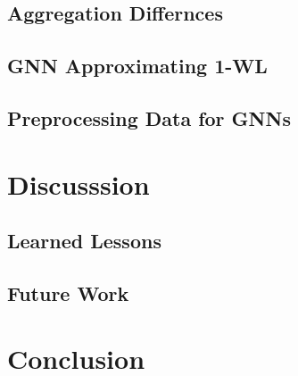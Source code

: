 \subsection{Aggregation Differnces}

\subsection{GNN Approximating 1-WL}

\subsection{Preprocessing Data for GNNs}

\section{Discusssion}
\subsection{Learned Lessons}
\subsection{Future Work}

\section{Conclusion}

\newpage


